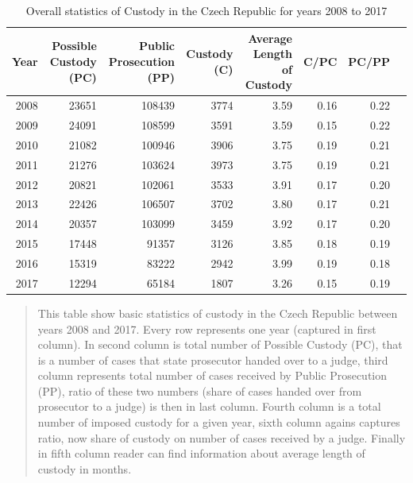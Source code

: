 \documentclass[12pt, twoside]{book} %
\begin{document}
\newpage

\begin{table}
\centering
\begin{tabular}{rrrrrrrr}
  \hline
 Year & Possible Custody (PC) & Public Prosecution (PP) & Custody (C) & Average Length of Custody & C/PC & PC/PP \\ 
  \hline
 2008 & 23651 & 108439 & 3774 & 3.59 & 0.16 & 0.22 \\ 
   2009 & 24091 & 108599 & 3591 & 3.59 & 0.15 & 0.22 \\ 
   2010 & 21082 & 100946 & 3906 & 3.75 & 0.19 & 0.21 \\ 
   2011 & 21276 & 103624 & 3973 & 3.75 & 0.19 & 0.21 \\ 
  2012 & 20821 & 102061 & 3533 & 3.91 & 0.17 & 0.20 \\ 
   2013 & 22426 & 106507 & 3702 & 3.80 & 0.17 & 0.21 \\ 
   2014 & 20357 & 103099 & 3459 & 3.92 & 0.17 & 0.20 \\ 
   2015 & 17448 & 91357 & 3126 & 3.85 & 0.18 & 0.19 \\ 
  2016 & 15319 & 83222 & 2942 & 3.99 & 0.19 & 0.18 \\ 
   2017 & 12294 & 65184 & 1807 & 3.26 & 0.15 & 0.19 \\ 
   \hline
\end{tabular}
  \caption{Overall statistics of Custody in the Czech Republic for years 2008 to 2017 }

 \medskip
{\small 
\begin{quotation}
This table show basic statistics of custody in the Czech Republic between years 2008 and 2017. Every row represents one year (captured in first column). In second column is total number of Possible Custody (PC), that is a number of cases that state prosecutor handed over to a judge, third column represents total number of cases received by Public Prosecution (PP), ratio of these two numbers (share of cases handed over from prosecutor to a judge) is then in last column. Fourth column is a total number of imposed custody for a given year, sixth column agains captures ratio, now share of custody on number of cases received by a judge. Finally in fifth column reader can find information about average length of custody in months.
\end{quotation}
}
\end{table}
\end{document}
